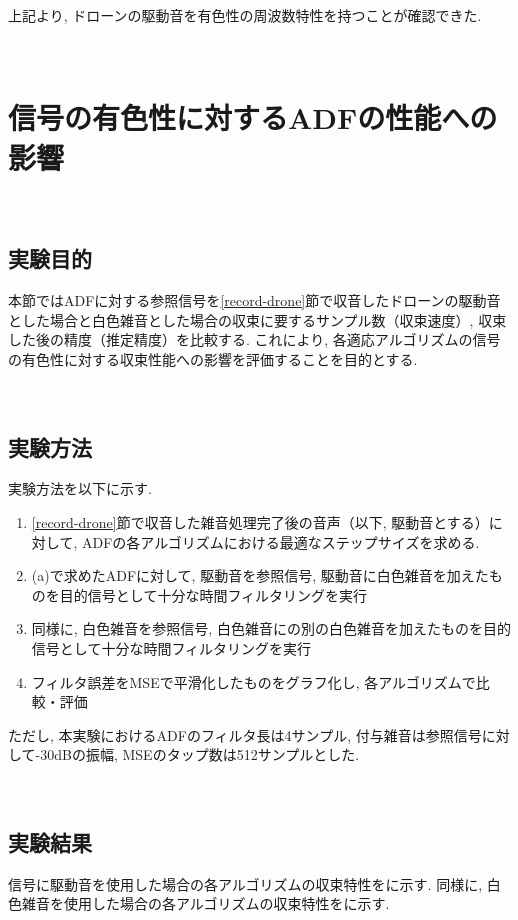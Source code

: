 上記より, ドローンの駆動音を有色性の周波数特性を持つことが確認できた. 

\newpage

\
\section{信号の有色性に対するADFの性能への影響}\label{adf-color-effect}

\
\subsection{実験目的}\label{purpose-color}

本節ではADFに対する参照信号を\ref{record-drone}節で収音したドローンの駆動音とした場合と白色雑音とした場合の収束に要するサンプル数（収束速度）, 収束した後の精度（推定精度）を比較する. 
これにより, 各適応アルゴリズムの信号の有色性に対する収束性能への影響を評価することを目的とする. 


\
\subsection{実験方法}\label{instruction-color}

実験方法を以下に示す. 

\begin{enumerate}
\renewcommand{\labelenumi}{(\arabic{enumi})}
\item
  \ref{record-drone}節で収音した雑音処理完了後の音声（以下, 駆動音とする）に対して, ADFの各アルゴリズムにおける最適なステップサイズを求める. 
\item
  (a)で求めたADFに対して, 駆動音を参照信号, 駆動音に白色雑音を加えたものを目的信号として十分な時間フィルタリングを実行
\item
  同様に, 白色雑音を参照信号, 白色雑音にの別の白色雑音を加えたものを目的信号として十分な時間フィルタリングを実行
\item
  フィルタ誤差をMSEで平滑化したものをグラフ化し, 各アルゴリズムで比較・評価
\end{enumerate}

ただし, 本実験におけるADFのフィルタ長は4サンプル, 付与雑音は参照信号に対して-30dBの振幅, MSEのタップ数は512サンプルとした. 

\
\subsection{実験結果}\label{result-color}

信号に駆動音を使用した場合の各アルゴリズムの収束特性をに示す. 同様に, 白色雑音を使用した場合の各アルゴリズムの収束特性をに示す. 

